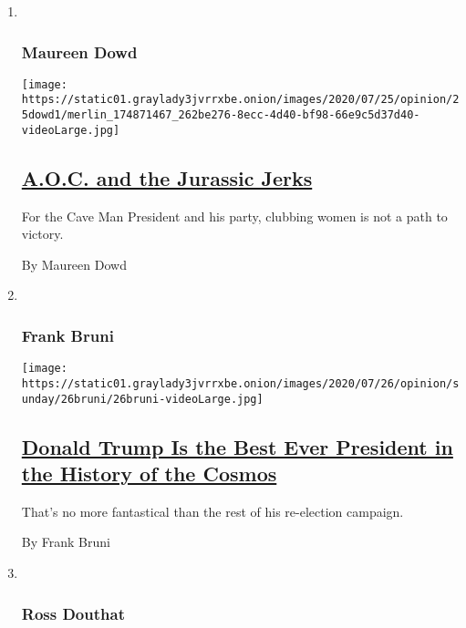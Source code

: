 \begin{enumerate}
\def\labelenumi{\arabic{enumi}.}
\item ~
  \hypertarget{maureen-dowd}{%
  \subsubsection{Maureen Dowd}\label{maureen-dowd}}

  \texttt{[image: https://static01.graylady3jvrrxbe.onion/images/2020/07/25/opinion/25dowd1/merlin\_174871467\_262be276-8ecc-4d40-bf98-66e9c5d37d40-videoLarge.jpg]}

  \hypertarget{aoc-and-the-jurassic-jerks}{%
  \subsection{\texorpdfstring{\href{/2020/07/25/opinion/sunday/aoc-yoho-trump-2020.html}{A.O.C.
  and the Jurassic
  Jerks}}{A.O.C. and the Jurassic Jerks}}\label{aoc-and-the-jurassic-jerks}}

  For the Cave Man President and his party, clubbing women is not a path
  to victory.

  By Maureen Dowd
\item ~
  \hypertarget{frank-bruni}{%
  \subsubsection{Frank Bruni}\label{frank-bruni}}

  \texttt{[image: https://static01.graylady3jvrrxbe.onion/images/2020/07/26/opinion/sunday/26bruni/26bruni-videoLarge.jpg]}

  \hypertarget{donald-trump-is-the-best-ever-president-in-the-history-of-the-cosmos}{%
  \subsection{\texorpdfstring{\href{/2020/07/25/opinion/sunday/trump-lies.html}{Donald
  Trump Is the Best Ever President in the History of the
  Cosmos}}{Donald Trump Is the Best Ever President in the History of the Cosmos}}\label{donald-trump-is-the-best-ever-president-in-the-history-of-the-cosmos}}

  That's no more fantastical than the rest of his re-election campaign.

  By Frank Bruni
\item ~
  \hypertarget{ross-douthat}{%
  \subsubsection{Ross Douthat}\label{ross-douthat}}


\end{enumerate}
